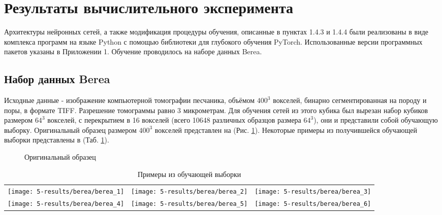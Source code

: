 \clearpage
\section{Результаты вычислительного эксперимента}
	Архитектуры нейронных сетей, а также модификация процедуры обучения, описанные в пунктах 1.4.3 и 1.4.4 были реализованы в виде комплекса программ на языке Python с помощью библиотеки для глубокого обучения PyTorch. Использованные версии программных пакетов указаны в Приложении 1. Обучение проводилось на наборе данных Berea.
	
	\subsection{Набор данных Berea}
		Исходные данные - изображение компьютерной томографии песчаника, объёмом $400^3$ вокселей, бинарно сегментированная на породу и поры, в формате TIFF. Разрешение томограммы равно 3 микрометрам. Для обучения сетей из этого кубика был вырезан набор кубиков размером $64^3$ вокселей, с перекрытием в 16 вокселей (всего 10648 различных образцов размера $64^3$), они и представили собой обучающую выборку. Оригинальный образец размером $400^3$ вокселей представлен на (Рис. \ref{5-full-berea}). Некоторые примеры из получившейся обучающей выборки представлены в (Таб. \ref{5-berea64}).
		
		\begin{figure}[h!]
			\caption{Оригинальный образец}
			\label{5-full-berea}
		\end{figure}
	
		\begin{table}[h!]
			\begin{center}
				\begin{tabular}{p{5cm} p{5cm} p{5cm}}
					\toprule
					\texttt{[image: 5-results/berea/berea\_1]}
					&
					\texttt{[image: 5-results/berea/berea\_2]}
					&
					\texttt{[image: 5-results/berea/berea\_3]}
					\\
					\texttt{[image: 5-results/berea/berea\_4]}
					&
					\texttt{[image: 5-results/berea/berea\_5]}
					&
					\texttt{[image: 5-results/berea/berea\_6]}
					\\
					\bottomrule
				\end{tabular}
				\caption{Примеры из обучающей выборки}
				\label{5-berea64}
			\end{center}
		\end{table}
